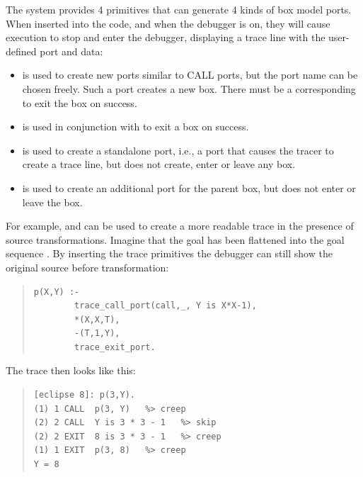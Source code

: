 The system provides 4 primitives that can generate 4 kinds of box model ports.
When inserted into the code, and when the debugger is on,
they will cause execution to stop and enter the debugger,
displaying a trace line with the user-defined port and data:
\begin{itemize}
\item {}
	is used to create new ports similar to CALL ports, but the port name
	can be chosen freely. Such a port creates a new box. There must be
	a corresponding  to exit the box on
        success.
\item {}
	is used in conjunction with  to exit a box
	on success.
\item {}
	is used to create a standalone port, i.e., a port that causes the
	tracer to create a trace line, but does not create, enter or leave
	any box.
\item {}
	is used to create an additional port for the parent box, but does
	not enter or leave the box.
\end{itemize}
For example,  and 
can be used to
create a more readable trace in the presence of source
transformations.  Imagine that the goal 
has been flattened into the goal sequence .
By inserting the trace primitives the debugger can still show the
original source before transformation:
\begin{quote}
\begin{verbatim}
p(X,Y) :-
        trace_call_port(call,_, Y is X*X-1),
        *(X,X,T),
        -(T,1,Y),
        trace_exit_port.
\end{verbatim}
\end{quote}
The trace then looks like this:
\begin{quote}
\begin{verbatim}
[eclipse 8]: p(3,Y).
(1) 1 CALL  p(3, Y)   %> creep
(2) 2 CALL  Y is 3 * 3 - 1   %> skip
(2) 2 EXIT  8 is 3 * 3 - 1   %> creep
(1) 1 EXIT  p(3, 8)   %> creep
Y = 8
\end{verbatim}
\end{quote}
